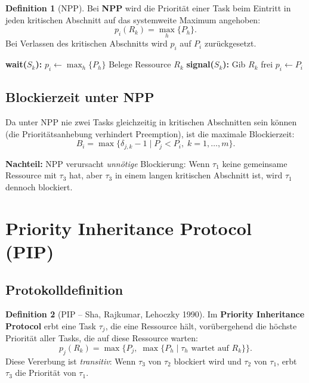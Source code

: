 ﻿\documentclass[a4paper,12pt]{report}
\theoremstyle{definition}
\newtheorem{definition}{Definition}[chapter]
\begin{document}
\begin{definition}[NPP]
	Bei \textbf{NPP} wird die Priorität einer Task beim Eintritt in jeden
	kritischen Abschnitt auf das systemweite Maximum angehoben:
	\[
		p_i(R_k) = \max_h \{P_h\}.
	\]
	Bei Verlassen des kritischen Abschnitts wird $p_i$ auf $P_i$ zurückgesetzt.
\end{definition}

\begin{algorithm}[H]
	\caption{Non-Preemptive Protocol (NPP)}
	\begin{algorithmic}[1]
		\State \textbf{wait($S_k$):}
		\State $p_i \leftarrow \max_h\{P_h\}$ 
		\State Belege Ressource $R_k$
		\State
		\State \textbf{signal($S_k$):}
		\State Gib $R_k$ frei
		\State $p_i \leftarrow P_i$ 
	\end{algorithmic}
\end{algorithm}

\subsection{Blockierzeit unter NPP}

Da unter NPP nie zwei Tasks gleichzeitig in kritischen Abschnitten sein können
(die Prioritätsanhebung verhindert Preemption), ist die maximale Blockierzeit:
\[
	B_i = \max\{\delta_{j,k} - 1 \mid P_j < P_i,\; k=1,\ldots,m\}.
\]

\textbf{Nachteil:} NPP verursacht \emph{unnötige} Blockierung: Wenn $\tau_1$ keine
gemeinsame Ressource mit $\tau_3$ hat, aber $\tau_3$ in einem langen kritischen
Abschnitt ist, wird $\tau_1$ dennoch blockiert.

\section{Priority Inheritance Protocol (PIP)}

\subsection{Protokolldefinition}

\begin{definition}[PIP -- Sha, Rajkumar, Lehoczky 1990]
	Im \textbf{Priority Inheritance Protocol} erbt eine Task $\tau_j$, die eine
	Ressource hält, vorübergehend die höchste Priorität aller Tasks, die auf diese
	Ressource warten:
	\[
		p_j(R_k) = \max\bigl\{P_j,\; \max\{P_h \mid \tau_h \text{ wartet auf } R_k\}\bigr\}.
	\]
	Diese Vererbung ist \emph{transitiv}: Wenn $\tau_3$ von $\tau_2$ blockiert wird
	und $\tau_2$ von $\tau_1$, erbt $\tau_3$ die Priorität von $\tau_1$.
\end{definition}
\end{document}
